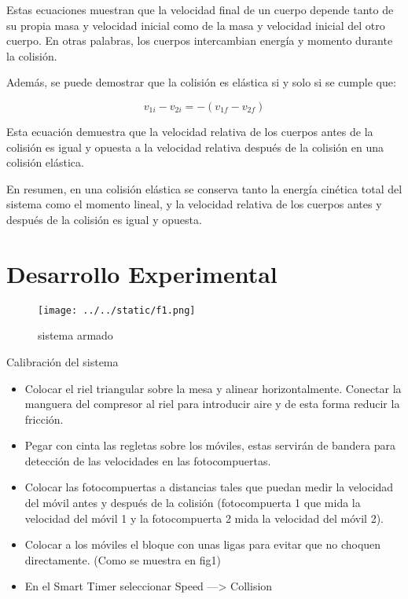 \documentclass{article}
\begin{document}
\begin{multicols}{2}
Estas ecuaciones muestran que la velocidad final de un cuerpo depende tanto de su propia masa y velocidad inicial como de la masa y velocidad inicial del otro cuerpo. En otras palabras, los cuerpos intercambian energía y momento durante la colisión.

Además, se puede demostrar que la colisión es elástica si y solo si se cumple que:

\begin{equation}
v_{1i} - v_{2i} = -(v_{1f} - v_{2f})
\end{equation}

Esta ecuación demuestra que la velocidad relativa de los cuerpos antes de la colisión es igual y opuesta a la velocidad relativa después de la colisión en una colisión elástica.

En resumen, en una colisión elástica se conserva tanto la energía cinética total del sistema como el momento lineal, y la velocidad relativa de los cuerpos antes y después de la colisión es igual y opuesta.


\section{Desarrollo Experimental}\label{Desarrollo experimental}				%
\begin{figure}[H]
	\centering
	\texttt{[image: ../../static/f1.png]}
	\caption{sistema armado}
	\label{fig:1}
\end{figure}

Calibración del sistema
\begin{itemize}
\item Colocar el riel triangular sobre la mesa y alinear horizontalmente. Conectar la manguera del compresor al riel para introducir aire y de esta forma reducir la fricción.
\item Pegar con cinta las regletas sobre los móviles, estas servirán de bandera para detección de las velocidades en las fotocompuertas.
\item Colocar las fotocompuertas a distancias tales que puedan medir la velocidad del móvil antes y después de la colisión (fotocompuerta 1 que mida la velocidad del móvil 1 y la fotocompuerta 2 mida la velocidad del móvil 2).
\item Colocar a los móviles el bloque con unas ligas para evitar que no choquen directamente. (Como se muestra en fig1)
\item En el Smart Timer seleccionar Speed —> Collision
\end{itemize}


\end{multicols}
\end{document}
